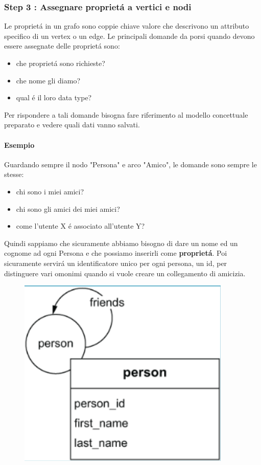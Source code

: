 \subsubsection*{Step 3 : Assegnare proprietá a vertici e nodi}
Le proprietá in un grafo sono coppie chiave valore che descrivono un attributo specifico di un vertex o un edge. Le principali domande da porsi quando devono essere assegnate delle proprietá sono: 
\begin{itemize}
    \item che proprietá sono richieste?
    \item che nome gli diamo?
    \item qual é il loro data type?
\end{itemize}
Per rispondere a tali domande bisogna fare riferimento al modello concettuale preparato e vedere quali dati vanno salvati. 

\paragraph{Esempio} Guardando sempre il nodo "Persona" e arco "Amico", le domande sono sempre le stesse:
\begin{itemize}
    \item chi sono i miei amici?
    \item chi sono gli amici dei miei amici?
    \item come l'utente X é associato all'utente Y?
\end{itemize}
Quindi sappiamo che sicuramente abbiamo bisogno di dare un nome ed un cognome ad ogni Persona e che possiamo inserirli come \textbf{proprietá}. Poi sicuramente servirá un identificatore unico per ogni persona, un id, per distinguere vari omonimi quando si vuole creare un collegamento di amicizia. 
\\
\begin{figure}[th]
    \centering
    \includegraphics[width=0.25\linewidth]{GraphModeling//img/properties.png}
\end{figure}
\\
